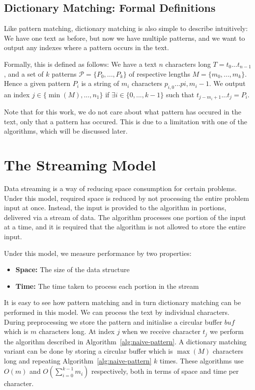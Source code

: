 \documentclass[ %
                    author={Dominic Joseph Moylett},
                supervisor={Dr. Raphael Clifford and Dr. Benjamin Sach},
                    degree={MEng},
                     title={Dictionary Matching with Fingerprints},
                  subtitle={An Empirical Analysis},
                      type={Research},
                      year={2014} ]{dissertation}
\begin{document}
\subsection{Dictionary Matching: Formal Definitions}

\noindent
Like pattern matching, dictionary matching is also simple to describe intuitively: We have one text as before, but now we have multiple patterns, and we want to output any indexes where a pattern occurs in the text.

Formally, this is defined as follows: We have a text $n$ characters long $T = t_0...t_{n-1}$, and a set of $k$ patterns $\mathcal{P} = \{P_0,...,P_k\}$ of respective lengths $M = \{m_0,...,m_k\}$. Hence a given pattern $P_i$ is a string of $m_i$ characters $p_{i,0}...p{i,m_i-1}$. We output an index $j \in \{\min(M),...,n_1\}$ if $\exists i \in \{0,...,k-1\}$ such that $t_{j-m_i+1}...t_{j} = P_i$.

Note that for this work, we do not care about what pattern has occured in the text, only that a pattern has occured. This is due to a limitation with one of the algorithms, which will be discussed later.

\section{The Streaming Model}

\noindent
Data streaming is a way of reducing space consumption for certain problems. Under this model, required space is reduced by not processing the entire problem input at once. Instead, the input is provided to the algorithm in portions, delivered via a stream of data. The algorithm processes one portion of the input at a time, and it is required that the algorithm is not allowed to store the entire input.

Under this model, we measure performance by two properties:
\begin{itemize}
  \item {\bf Space:} The size of the data structure
  \item {\bf Time:} The time taken to process each portion in the stream
\end{itemize}

It is easy to see how pattern matching and in turn dictionary matching can be performed in this model. We can process the text by individual characters. During preprocessing we store the pattern and initialise a circular buffer $buf$ which is $m$ characters long. At index $j$ when we receive character $t_j$ we perform the algorithm described in Algorithm~\ref{alg:naive-pattern}. A dictionary matching variant can be done by storing a circular buffer which is $\max(M)$ characters long and repeating Algorithm~\ref{alg:naive-pattern} $k$ times. These algorithms use $O(m)$ and $O(\sum^{k-1}_{i=0}m_i)$ respectively, both in terms of space and time per character.
\end{document}
